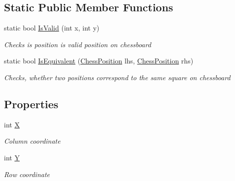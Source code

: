 \subsection*{Static Public Member Functions}
\begin{DoxyCompactItemize}
\item 
static bool \mbox{\hyperlink{class_chess_tracking_1_1_game_1_1_chess_position_ad32aafa65d366856bc27b37565e0aff8}{Is\+Valid}} (int x, int y)
\begin{DoxyCompactList}\small\item\em Checks is position is valid position on chessboard \end{DoxyCompactList}\item 
static bool \mbox{\hyperlink{class_chess_tracking_1_1_game_1_1_chess_position_ac4f8302f35f751eba3c9baa8a3ec43d0}{Is\+Equivalent}} (\mbox{\hyperlink{class_chess_tracking_1_1_game_1_1_chess_position}{Chess\+Position}} lhs, \mbox{\hyperlink{class_chess_tracking_1_1_game_1_1_chess_position}{Chess\+Position}} rhs)
\begin{DoxyCompactList}\small\item\em Checks, whether two positions correspond to the same square on chessboard \end{DoxyCompactList}\end{DoxyCompactItemize}
\subsection*{Properties}
\begin{DoxyCompactItemize}
\item 
int \mbox{\hyperlink{class_chess_tracking_1_1_game_1_1_chess_position_a6900df7ad0744748c4b4da4452b9701a}{X}}
\begin{DoxyCompactList}\small\item\em Column coordinate \end{DoxyCompactList}\item 
int \mbox{\hyperlink{class_chess_tracking_1_1_game_1_1_chess_position_a44dd6acdeb33707df6cc3d40119554ba}{Y}}
\begin{DoxyCompactList}\small\item\em Row coordinate \end{DoxyCompactList}\end{DoxyCompactItemize}


